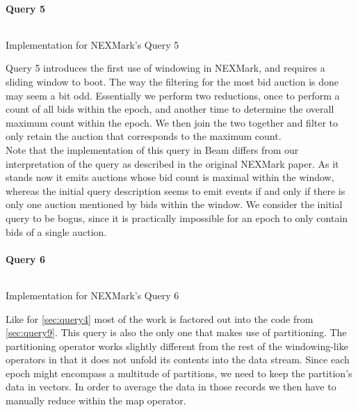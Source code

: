 \paragraph{Query 5}
\begin{listing}[H]
  \inputminted[firstline=562,lastline=571]{rust}{benchmarks/src/nexmark.rs}
  \caption{Implementation for NEXMark's Query 5}
  \label{lst:nexmark-query5}
\end{listing}

Query 5 introduces the first use of windowing in NEXMark, and requires a sliding window to boot. The way the filtering for the most bid auction is done may seem a bit odd. Essentially we perform two reductions, once to perform a count of all bids within the epoch, and another time to determine the overall maximum count within the epoch. We then join the two together and filter to only retain the auction that corresponds to the maximum count. \\

Note that the implementation of this query in Beam differs from our interpretation of the query as described in the original NEXMark paper. As it stands now it emits auctions whose bid count is maximal within the window, whereas the initial query description seems to emit events if and only if there is only one auction mentioned by bids within the window. We consider the initial query to be bogus, since it is practically impossible for an epoch to only contain bids of a single auction.

\paragraph{Query 6}
\begin{listing}[H]
  \inputminted[firstline=596,lastline=598]{rust}{benchmarks/src/nexmark.rs}
  \caption{Implementation for NEXMark's Query 6}
  \label{lst:nexmark-query6}
\end{listing}

Like for \autoref{sec:query4} most of the work is factored out into the code from \autoref{sec:query9}. This query is also the only one that makes use of partitioning. The partitioning operator works slightly different from the rest of the windowing-like operators in that it does not unfold its contents into the data stream. Since each epoch might encompass a multitude of partitions, we need to keep the partition's data in vectors. In order to average the data in those records we then have to manually reduce within the map operator.

